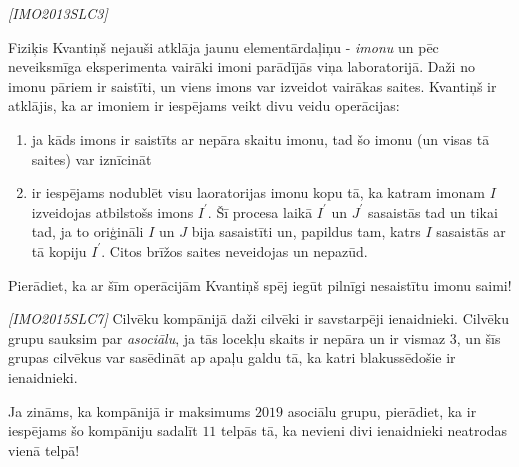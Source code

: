 \begin{problem}
\textit{[IMO2013SLC3]}

Fiziķis Kvantiņš nejauši atklāja jaunu elementārdaļiņu - \textit{imonu} un pēc neveiksmīga eksperimenta vairāki imoni parādījās viņa laboratorijā. Daži no imonu pāriem ir saistīti, un viens imons var izveidot vairākas saites. Kvantiņš ir atklājis, ka ar imoniem ir iespējams veikt divu veidu operācijas:
\begin{enumerate}
\item ja kāds imons ir saistīts ar nepāra skaitu imonu, tad šo imonu (un visas tā saites) var iznīcināt
\item ir iespējams nodublēt visu laoratorijas imonu kopu tā, ka katram imonam $I$ izveidojas atbilstošs imons $I^\prime$. Šī procesa laikā $I^\prime$ un $J^\prime$ sasaistās tad un tikai tad, ja to oriģināli $I$ un $J$ bija sasaistīti un, papildus tam, katrs $I$ sasaistās ar tā kopiju $I^\prime$. Citos brīžos saites neveidojas un nepazūd.
\end{enumerate}

Pierādiet, ka ar šīm operācijām Kvantiņš spēj iegūt pilnīgi nesaistītu imonu saimi!

\end{problem}
%

\begin{problem}
\textit{[IMO2015SLC7]}
Cilvēku kompānijā daži cilvēki ir savstarpēji ienaidnieki. Cilvēku grupu sauksim par \textit{asociālu}, ja tās locekļu skaits ir nepāra un ir vismaz $3$, un šīs grupas cilvēkus var sasēdināt ap apaļu galdu tā, ka katri blakussēdošie ir ienaidnieki.

Ja zināms, ka kompānijā ir maksimums $2019$ asociālu grupu, pierādiet, ka ir iespējams šo kompāniju sadalīt $11$ telpās tā, ka nevieni divi ienaidnieki neatrodas vienā telpā!
\end{problem}
%

